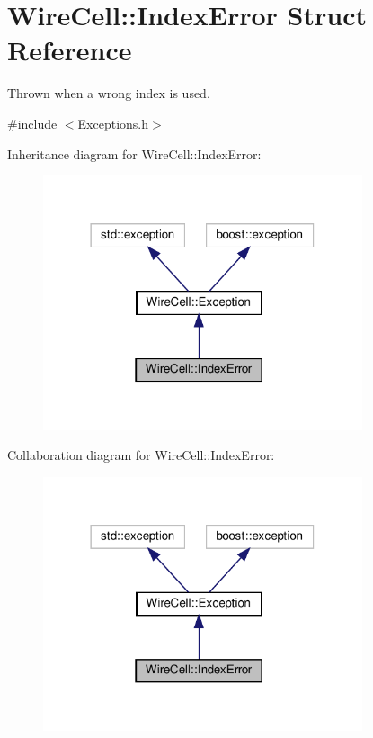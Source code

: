 \hypertarget{struct_wire_cell_1_1_index_error}{}\section{Wire\+Cell\+:\+:Index\+Error Struct Reference}
\label{struct_wire_cell_1_1_index_error}


Thrown when a wrong index is used.  




{\ttfamily \#include $<$Exceptions.\+h$>$}



Inheritance diagram for Wire\+Cell\+:\+:Index\+Error\+:
\nopagebreak
\begin{figure}[H]
\begin{center}
\leavevmode
\includegraphics[width=266pt]{struct_wire_cell_1_1_index_error__inherit__graph}
\end{center}
\end{figure}


Collaboration diagram for Wire\+Cell\+:\+:Index\+Error\+:
\nopagebreak
\begin{figure}[H]
\begin{center}
\leavevmode
\includegraphics[width=266pt]{struct_wire_cell_1_1_index_error__coll__graph}
\end{center}
\end{figure}

